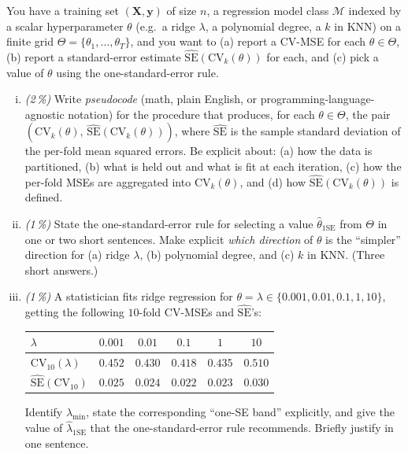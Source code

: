 \documentclass[11pt,a4paper]{article}
\newcommand{\subpoints}[1]{\textit{(#1\,\%)}}
\begin{document}
You have a training set $(\mathbf X, \mathbf y)$ of size $n$, a regression model class $\mathcal{M}$ indexed by a scalar hyperparameter $\theta$ (e.g.\ a ridge $\lambda$, a polynomial degree, a $k$ in KNN) on a finite grid $\Theta = \{\theta_1, \dots, \theta_T\}$, and you want to (a) report a CV-MSE for each $\theta \in \Theta$, (b) report a standard-error estimate $\widehat{\mathrm{SE}}(\mathrm{CV}_k(\theta))$ for each, and (c) pick a value of $\theta$ using the one-standard-error rule.

\begin{enumerate}[(i)]
  \item \subpoints{2} Write \emph{pseudocode} (math, plain English, or programming-language-agnostic notation) for the procedure that produces, for each $\theta \in \Theta$, the pair $(\mathrm{CV}_k(\theta),\, \widehat{\mathrm{SE}}(\mathrm{CV}_k(\theta)))$, where $\widehat{\mathrm{SE}}$ is the sample standard deviation of the per-fold mean squared errors. Be explicit about: (a) how the data is partitioned, (b) what is held out and what is fit at each iteration, (c) how the per-fold MSEs are aggregated into $\mathrm{CV}_k(\theta)$, and (d) how $\widehat{\mathrm{SE}}(\mathrm{CV}_k(\theta))$ is defined.

  \item \subpoints{1} State the one-standard-error rule for selecting a value $\hat\theta_{1\mathrm{SE}}$ from $\Theta$ in one or two short sentences. Make explicit \emph{which direction} of $\theta$ is the ``simpler'' direction for (a) ridge $\lambda$, (b) polynomial degree, and (c) $k$ in KNN. (Three short answers.)

  \item \subpoints{1} A statistician fits ridge regression for $\theta = \lambda \in \{0.001, 0.01, 0.1, 1, 10\}$, getting the following $10$-fold CV-MSEs and $\widehat{\mathrm{SE}}$'s:

  \begin{center}\small
  \begin{tabular}{lccccc}
  \toprule
  $\lambda$                                & $0.001$ & $0.01$ & $0.1$  & $1$    & $10$   \\
  \midrule
  $\mathrm{CV}_{10}(\lambda)$              & $0.452$ & $0.430$ & $0.418$ & $0.435$ & $0.510$ \\
  $\widehat{\mathrm{SE}}(\mathrm{CV}_{10})$ & $0.025$ & $0.024$ & $0.022$ & $0.023$ & $0.030$ \\
  \bottomrule
  \end{tabular}
  \end{center}

  Identify $\hat\lambda_{\min}$, state the corresponding ``one-SE band'' explicitly, and give the value of $\hat\lambda_{1\mathrm{SE}}$ that the one-standard-error rule recommends. Briefly justify in one sentence.
\end{enumerate}
\end{document}
